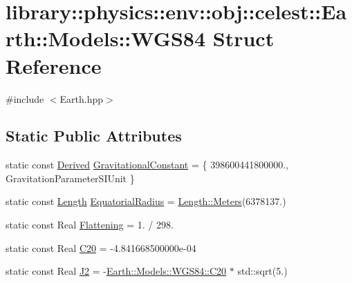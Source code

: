 \hypertarget{structlibrary_1_1physics_1_1env_1_1obj_1_1celest_1_1_earth_1_1_models_1_1_w_g_s84}{}\section{library\+:\+:physics\+:\+:env\+:\+:obj\+:\+:celest\+:\+:Earth\+:\+:Models\+:\+:W\+G\+S84 Struct Reference}
\label{structlibrary_1_1physics_1_1env_1_1obj_1_1celest_1_1_earth_1_1_models_1_1_w_g_s84}


{\ttfamily \#include $<$Earth.\+hpp$>$}

\subsection*{Static Public Attributes}
\begin{DoxyCompactItemize}
\item 
static const \hyperlink{classlibrary_1_1physics_1_1units_1_1_derived}{Derived} \hyperlink{structlibrary_1_1physics_1_1env_1_1obj_1_1celest_1_1_earth_1_1_models_1_1_w_g_s84_a35ba4bf5721e4e203c9cb9afd9dc0c57}{Gravitational\+Constant} = \{ 398600441800000., Gravitation\+Parameter\+S\+I\+Unit \}
\item 
static const \hyperlink{classlibrary_1_1physics_1_1units_1_1_length}{Length} \hyperlink{structlibrary_1_1physics_1_1env_1_1obj_1_1celest_1_1_earth_1_1_models_1_1_w_g_s84_aee90c4d0599ffe6c6c677bb41f2ec74d}{Equatorial\+Radius} = \hyperlink{classlibrary_1_1physics_1_1units_1_1_length_ad523a3737d5c3f23a64588eac83f2148}{Length\+::\+Meters}(6378137.)
\item 
static const Real \hyperlink{structlibrary_1_1physics_1_1env_1_1obj_1_1celest_1_1_earth_1_1_models_1_1_w_g_s84_a069e4726791f8468019031d52adf99d0}{Flattening} = 1. / 298.
\item 
static const Real \hyperlink{structlibrary_1_1physics_1_1env_1_1obj_1_1celest_1_1_earth_1_1_models_1_1_w_g_s84_a10f72d2266521d5f5303e9a1ace4c492}{C20} = -\/4.\+841668500000e-\/04
\item 
static const Real \hyperlink{structlibrary_1_1physics_1_1env_1_1obj_1_1celest_1_1_earth_1_1_models_1_1_w_g_s84_ad5eb43e9e57723f3fed7f3da55e6d821}{J2} = -\/\hyperlink{structlibrary_1_1physics_1_1env_1_1obj_1_1celest_1_1_earth_1_1_models_1_1_w_g_s84_a10f72d2266521d5f5303e9a1ace4c492}{Earth\+::\+Models\+::\+W\+G\+S84\+::\+C20} $\ast$ std\+::sqrt(5.)
\end{DoxyCompactItemize}


